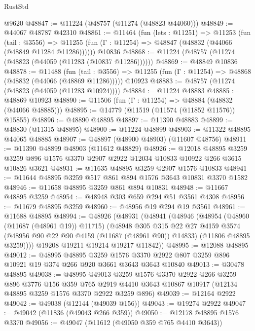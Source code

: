 \begin{lexlean}{RustStd}
\begin{coremodule}
    @9620
@48847 := @11224 (@48757 (@11274 (@48823 @44060)))
@48849 := @44067 @48787 @42310
@48861 := @11464
    (fun (lets : @11251) =>
    @11253
      (fun (tail : @3556) =>
      @11255 (fun (Γ : @11254) => @48847 (@48832 (@44066 (@48849 @11284 @11286))))))
    @10836
@48868 := @11224 (@48757 (@11274 (@48823 (@44059 (@11283 (@10837 @11286))))))
@48869 := @48849 @10836
@48878 := @11488
    (fun (tail : @3556) => @11255 (fun (Γ : @11254) => @48868 (@48832 (@44066 (@48869 @11286)))))
    @10923
@48883 := @48757 (@11274 (@48823 (@44059 (@11283 @10924))))
@48884 := @11224 @48883
@48885 := @48869 @10923
@48890 := @11506 (fun (Γ : @11254) => @48884 (@48832 (@44066 @48885)))
@48895 := @14779 (@11519 (@11574 (@11852 @11576)) @15855)
@48896 := @48890 @48895
@48897 := @11390 @48883
@48899 := @48830 (@11315 @48895)
@48900 := @11224 @48899
@48903 := @11322 @48895 @44065 @48885
@48907 := @48897 (@48900 @48903) (@11607 @48756)
@48911 := @11390 @48899 @48903 (@11612 @48829)
@48926 := @12018
    @48895
    @3259
    @3259
    @896
    @1576
    @3370
    @2907
    @2922
    @12034
    @10833
    @10922
    @266
    @3615
    @10826
    @3621
@48931 := @11635 @48895 @3259 @2907 @1576 @10833
@48941 := @11644 @48895 @3259 @517 @861 @894 @1576 @3643 @10831 @3370 @1582
@48946 := @11658 @48895 @3259 @861 @894 @10831
@48948 := @11667 @48895 @3259
@48954 := @48948 @303 @659 @294 @51 @3561 @4308
@48956 := @11679 @48895 @3259
@48960 := @48956 @19 @294 @19 @3561
@48961 := @11688 @48895
@48994 := @48926
    (@48931
      (@48941
        (@48946
          (@48954
            (@48960 (@11687 (@48961 @19)) @11715)
            (@48948
              @305
              @315
              @22
              @27
              @4159
              @3574
              (@48956 @90 @22 @90 @4159 (@11687 (@48961 @90)) @14833)
              (@11806 @48895 @3259))))
        @19208
        @19211
        @19214
        @19217
        @11842))
@48995 := @12088 @48895
@49012 := @48995
    @48895
    @3259
    @1576
    @3370
    @2922
    @807
    @3259
    @896
    @10921
    @19
    @374
    @266
    @920
    @3661
    @3643
    @3643
    @10840
@49013 := @30478 @48895
@49038 := @48995
    @49013
    @3259
    @1576
    @3370
    @2922
    @266
    @3259
    @896
    @3776
    @156
    @359
    @765
    @2919
    @4410
    @3643
    @10867
    @10917
    (@12134 @48895 @3259 @1576 @3370 @2922 @3259 @896)
@49039 := @12164 @2922
@49042 := @49038 (@12144 (@49039 @156))
@49043 := @19274 @2922
@49047 := @49042 (@11836 (@49043 @266 @359))
@49050 := @12178 @48895 @1576 @3370
@49056 := @49047 (@11612 (@49050 @359 @765 @4410 @3643))

\end{coremodule}
\end{lexlean}
